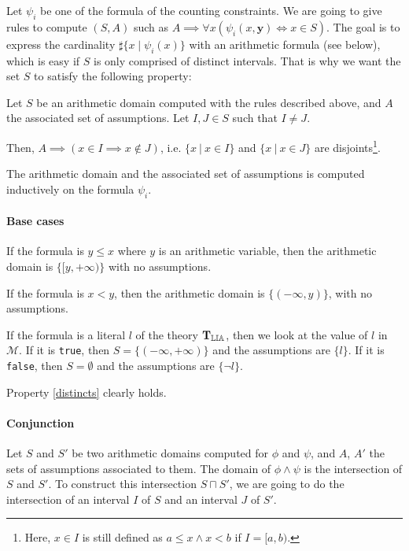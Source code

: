 Let $\psi_i$ be one of the formula of the counting constraints. We are going to give rules to compute $(S, A)$ such as
$A \implies \forall x \left(\psi_i(x, \mathbf{y}) \iff x \in S\right)$. The goal is to express the
cardinality $\sharp\{x \mid \psi_i(x)\}$ with an arithmetic formula (see below), which is easy if $S$ is only
comprised of distinct intervals. That is why we want the set $S$
to satisfy the following property:


\begin{property}[Distincts]

Let $S$ be an arithmetic domain computed with the rules described above, and $A$ the associated set of assumptions.
Let $I, J \in S$ such that $I \neq J$.

Then, $A \implies (x \in I \implies x \not\in J)$, i.e.
$\{x\ |\ x \in I\}$ and $\{x\ |\ x \in J\}$ are
disjoints\footnote{Here, $x \in I$ is still defined as $a \le x \land x < b$ if $I = [a, b)$.}.

\label{distincts}

\end{property}


The arithmetic domain and the associated set of assumptions is computed inductively on the formula
$\psi_i$.

\paragraph{Base cases}

If the formula is $y \le x$ where $y$ is an arithmetic variable, then the arithmetic domain is
$\{[y, +\infty)\}$ with no assumptions.

If the formula is $x < y$, then the arithmetic domain is $\{(-\infty, y)\}$, with no assumptions.

If the formula is a literal $l$ of the theory $\operatorname{\mathbf{T}_{\mathbb{LIA}}}$, then we look at the value of $l$ in
$\mathcal{M}$. If it is \texttt{true}, then $S = \{(-\infty, +\infty)\}$ and the assumptions are
$\{l\}$. If it is \texttt{false}, then $S = \emptyset$ and the assumptions are $\{\lnot l\}$.

Property \ref{distincts} clearly holds.

\paragraph{Conjunction}

Let $S$ and $S'$ be two arithmetic domains computed for $\phi$ and $\psi$, and $A$, $A'$ the sets of assumptions associated to
them. The domain of $\phi\land\psi$ is the intersection of $S$ and $S'$. To construct this intersection $S \sqcap S'$, we are going to
do the intersection of an interval $I$ of $S$ and an interval $J$
of $S'$.

